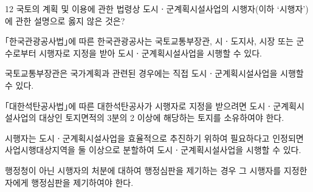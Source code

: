 \begin{question}{12}
국토의 계획 및 이용에 관한 법령상 도시ㆍ군계획시설사업의 시행자(이하 ‘시행자’)에 관한 설명으로 옳지 않은 것은?
\begin{choices}
  \item ｢한국관광공사법｣에 따른 한국관광공사는 국토교통부장관, 시ㆍ도지사, 시장 또는 군수로부터 시행자로 지정을 받아 도시ㆍ군계획시설사업을 시행할 수 있다.
  \item 국토교통부장관은 국가계획과 관련된 경우에는 직접 도시ㆍ군계획시설사업을 시행할 수 있다.
  \item ｢대한석탄공사법｣에 따른 대한석탄공사가 시행자로 지정을 받으려면 도시ㆍ군계획시설사업의 대상인 토지면적의 3분의 2 이상에 해당하는 토지를 소유하여야 한다.
  \item 시행자는 도시ㆍ군계획시설사업을 효율적으로 추진하기 위하여 필요하다고 인정되면 사업시행대상지역을 둘 이상으로 분할하여 도시ㆍ군계획시설사업을 시행할 수 있다.
  \item 행정청이 아닌 시행자의 처분에 대하여 행정심판을 제기하는 경우 그 시행자를 지정한 자에게 행정심판을 제기하여야 한다.
\end{choices}
\end{question}
